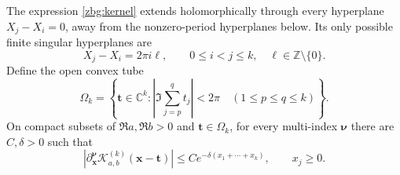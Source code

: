 \begin{lemma}\label{zbg:bounds}
The expression \eqref{zbg:kernel} extends holomorphically through
every hyperplane $X_j-X_i=0$, away from the nonzero-period
hyperplanes below. Its only possible finite singular
hyperplanes are
\[
 X_j-X_i=2\pi i\ell,\qquad 0\leq i<j\leq k,
                   \quad \ell\in\mathbb Z\setminus\{0\}.
\]
Define the open convex tube
\begin{equation}\label{zbg:tube}
 \Omega_k=\left\{\boldsymbol t\in\mathbb C^k:
   \left|\Im\sum_{j=p}^q t_j\right|<2\pi
                      \quad(1\leq p\leq q\leq k)\right\}.
\end{equation}
On compact subsets of $\Re a,\Re b>0$ and
$\boldsymbol t\in\Omega_k$, for every multi-index $\boldsymbol\nu$
there are $C,\delta>0$ such that
\begin{equation}\label{zbg:bound}
 \left|\partial_{\boldsymbol x}^{\boldsymbol\nu}
       \mathscr K_{a,b}^{(k)}(\boldsymbol x-\boldsymbol t)\right|
       \leq C e^{-\delta(x_1+\cdots+x_k)},\qquad x_j\geq0.
\end{equation}
\end{lemma}

